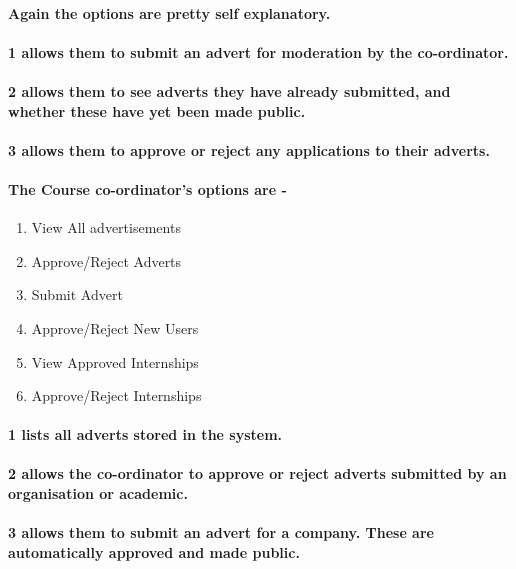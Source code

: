 \documentclass{article}
\begin{document}
\paragraph*{\textmd{Again the options are pretty self explanatory.}}


\paragraph*{\textmd{1 allows them to submit an advert for moderation by the co-ordinator.}}


\paragraph*{\textmd{2 allows them to see adverts they have already submitted,
and whether these have yet been made public.}}


\paragraph*{\textmd{3 allows them to approve or reject any applications to their
adverts.}}


\paragraph{\textmd{The Course co-ordinator's options are -}}
\begin{enumerate}
\item View All advertisements
\item Approve/Reject Adverts
\item Submit Advert 
\item Approve/Reject New Users 
\item View Approved Internships
\item Approve/Reject Internships 
\end{enumerate}

\paragraph{\textmd{1 lists all adverts stored in the system.}}


\paragraph{\textmd{2 allows the co-ordinator to approve or reject adverts submitted
by an organisation or academic.}}


\paragraph{\textmd{3 allows them to submit an advert for a company. These are
automatically approved and made public.}}
\end{document}
